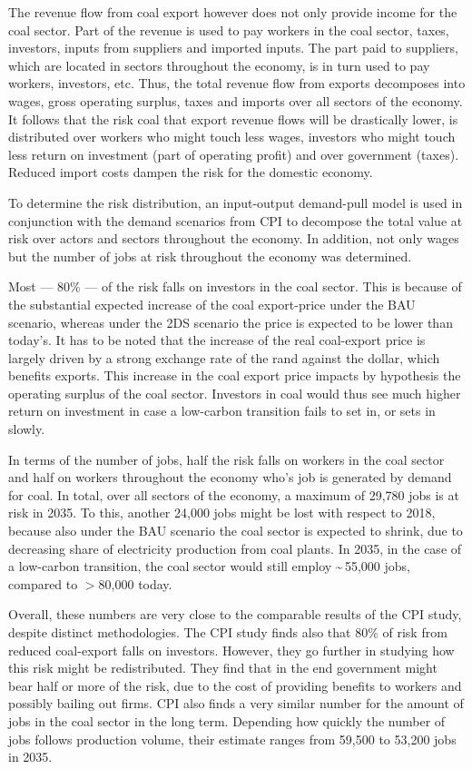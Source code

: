 \documentclass[12pt,english]{article}
\begin{document}
The revenue flow from coal export however does not only provide income for the coal sector. Part of the revenue is used to pay workers in the coal sector, taxes, investors, inputs from suppliers and imported inputs. The part paid to suppliers, which are located in sectors throughout the economy, is in turn used to pay workers, investors, etc. Thus, the total revenue flow from exports decomposes into wages, gross operating surplus, taxes and imports over all sectors of the economy. It follows that the risk coal that export revenue flows will be drastically lower, is distributed over workers who might touch less wages, investors who might touch less return on investment (part of operating profit) and over government (taxes). Reduced import costs dampen the risk for the domestic economy. 

To determine the risk distribution, an input-output demand-pull model is used in conjunction with the demand scenarios from CPI to decompose the total value at risk over actors and sectors throughout the economy. In addition, not only wages but the number of jobs at risk throughout the economy was determined.

Most --- 80\% --- of the risk falls on investors in the coal sector. This is because of the substantial expected increase of the coal export-price under the BAU scenario, whereas under the 2DS scenario the price is expected to be lower than today's. It has to be noted that the increase of the real coal-export price is largely driven by a strong exchange rate of the rand against the dollar, which benefits exports. This increase in the coal export price impacts by hypothesis the operating surplus of the coal sector. Investors in coal would thus see much higher return on investment in case a low-carbon transition fails to set in, or sets in slowly. 

In terms of the number of jobs, half the risk falls on workers in the coal sector and half on workers throughout the economy who's job is generated by demand for coal. In total, over all sectors of the economy, a maximum of 29,780 jobs is at risk in 2035. To this, another 24,000 jobs might be lost with respect to 2018, because also under the BAU scenario the coal sector is expected to shrink, due to decreasing share of electricity production from coal plants. In 2035, in the case of a low-carbon transition, the coal sector would still employ \textasciitilde \,55,000 jobs, compared to $>$80,000 today. 

Overall, these numbers are very close to the comparable results of the CPI study, despite distinct methodologies. The CPI study finds also that 80\% of risk from reduced coal-export falls on investors. However, they go further in studying how this risk might be redistributed. They find that in the end government might bear half or more of the risk, due to the cost of providing benefits to workers and possibly bailing out firms. CPI also finds a very similar number for the amount of jobs in the coal sector in the long term. Depending how quickly the number of jobs follows production volume, their estimate ranges from 59,500 to 53,200 jobs in 2035.
\end{document}
